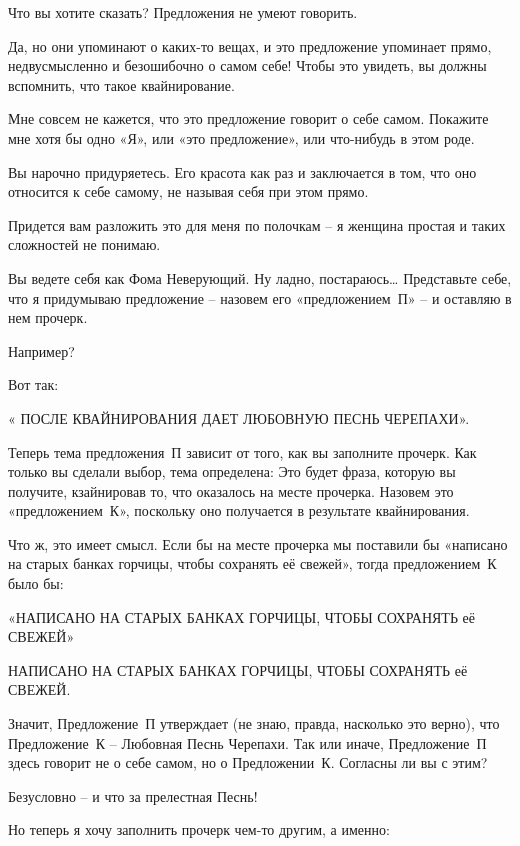 \documentclass[../main.tex]{subfiles}
\begin{document}
\begin{Dialogue}
 Что вы хотите сказать? Предложения не умеют говорить.

 Да, но они упоминают о каких-то вещах, и это предложение упоминает прямо, недвусмысленно и безошибочно о самом себе! Чтобы это увидеть, вы должны вспомнить, что такое квайнирование.

 Мне совсем не кажется, что это предложение говорит о себе самом. Покажите мне хотя бы одно «Я», или «это предложение», или что-нибудь в этом роде.

 Вы нарочно придуряетесь. Его красота как раз и заключается в том, что оно относится к себе самому, не называя себя при этом прямо.

 Придется вам разложить это для меня по полочкам \--- я женщина простая и таких сложностей не понимаю.

 Вы ведете себя как Фома Неверующий. Ну ладно, постараюсь\ldots{} Представьте себе, что я придумываю предложение \--- назовем его «предложением~П» \--- и оставляю в нем прочерк.

 Например?

 Вот так:

«\makebox[3em]{\ulfill} ПОСЛЕ КВАЙНИРОВАНИЯ ДАЕТ ЛЮБОВНУЮ ПЕСНЬ ЧЕРЕПАХИ».

Теперь тема предложения~П зависит от того, как вы заполните прочерк. Как только вы сделали выбор, тема определена: Это будет фраза, которую вы получите, кзайнировав то, что оказалось на месте прочерка. Назовем это «предложением~К», поскольку оно получается в результате квайнирования.

 Что ж, это имеет смысл. Если бы на месте прочерка мы поставили бы «написано на старых банках горчицы, чтобы сохранять её свежей», тогда предложением~К было бы:

«НАПИСАНО НА СТАРЫХ БАНКАХ ГОРЧИЦЫ, ЧТОБЫ СОХРАНЯТЬ её СВЕЖЕЙ»

НАПИСАНО НА СТАРЫХ БАНКАХ ГОРЧИЦЫ, ЧТОБЫ СОХРАНЯТЬ её СВЕЖЕЙ.

 Значит, Предложение~П утверждает (не знаю, правда, насколько это верно), что Предложение~К \--- Любовная Песнь Черепахи. Так или иначе, Предложение~П здесь говорит не о себе самом, но о Предложении~К. Согласны ли вы с этим?

 Безусловно \--- и что за прелестная Песнь!

 Но теперь я хочу заполнить прочерк чем-то другим, а именно:


\end{Dialogue}
\end{document}
